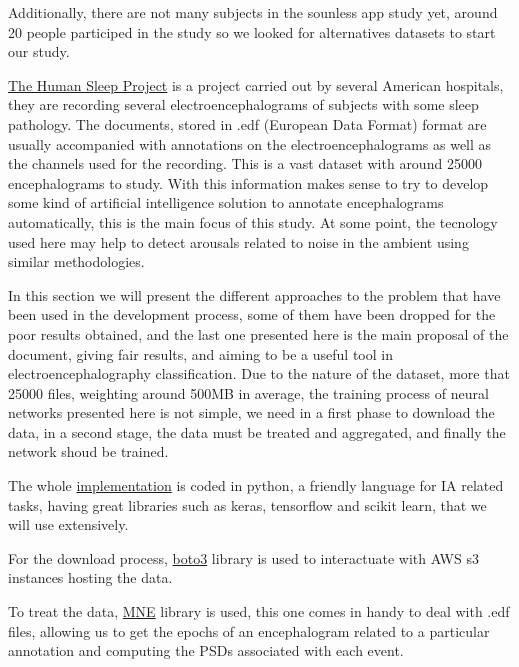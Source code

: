 Additionally, there are not many subjects in the sounless app study yet, around 20 people participed in the study so we looked for alternatives datasets to start our study.

\href{https://bdsp.io/content/hsp/2.0/}{The Human Sleep Project} is a project carried out by several American hospitals, they are recording several electroencephalograms of subjects with some sleep pathology. The documents, stored in .edf (European Data Format) format are usually accompanied with annotations on the electroencephalograms as well as the channels used for the recording. This is a vast dataset with around 25000 encephalograms to study. With this information makes sense to try to develop some kind of artificial intelligence solution to annotate encephalograms automatically, this is the main focus of this study. At some point, the tecnology used here may help to detect arousals related to noise in the ambient using similar methodologies. 

\blindtext

\blindtext

In this section we will present the different approaches to the problem that have been used in the development process, some of them have been dropped for the poor results obtained, and the last one presented here is the main proposal of the document, giving fair results, and aiming to be a useful tool in electroencephalography classification. Due to the nature of the dataset, more that 25000 files, weighting around 500MB in average, the training process of neural networks presented here is not simple, we need in a first phase to download the data, in a second stage, the data must be treated and aggregated, and finally the network shoud be trained.

The whole \href{https://github.com/szz-dvl/soundless/tree/main}{implementation} is coded in python, a friendly language for IA related tasks, having great libraries such as keras, tensorflow and scikit learn, that we will use extensively.

For the download process, \href{https://pypi.org/project/boto3/}{boto3} library is used to interactuate with AWS s3 instances hosting the data.

To treat the data, \href{https://mne.tools/stable/index.html}{MNE} library is used, this one comes in handy to deal with .edf files, allowing us to get the epochs of an encephalogram related to a particular annotation and computing the PSDs associated with each event.

